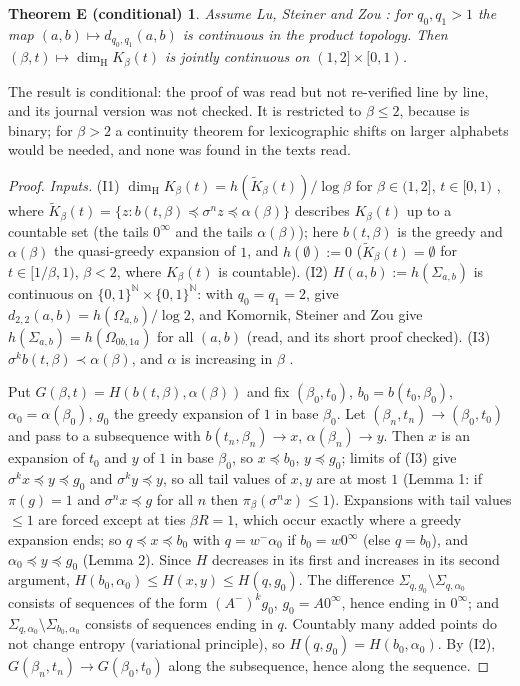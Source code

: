 \documentclass[11pt]{amsart}
\newtheorem*{thmE}{Theorem E (conditional)}
\theoremstyle{remark}
\newcommand{\N}{\mathbb{N}}
\newcommand{\dimH}{\dim_{\mathrm H}}
\newcommand{\lex}{\preccurlyeq}
\begin{document}
\begin{thmE}
Assume Lu, Steiner and Zou \cite[Theorem~1.4]{LSZ}: for $q_0,q_1>1$ the map $(a,b)\mapsto d_{q_0,q_1}(a,b)$ is continuous in the product topology. Then $(\beta,t)\mapsto\dimH K_\beta(t)$ is jointly continuous on $(1,2]\times[0,1)$.
\end{thmE}

The result is conditional: the proof of \cite[Theorem~1.4]{LSZ} was read but not re-verified line by line, and its journal version was not checked. It is restricted to $\beta\le2$, because \cite{LSZ} is binary; for $\beta>2$ a continuity theorem for lexicographic shifts on larger alphabets would be needed, and none was found in the texts read.

\begin{proof}
\emph{Inputs.} (I1) $\dimH K_\beta(t)=h(\tilde K_\beta(t))/\log\beta$ for $\beta\in(1,2]$, $t\in[0,1)$ \cite[Lemma~2.11]{AKcrit}, where $\tilde K_\beta(t)=\{z:b(t,\beta)\lex\sigma^nz\lex\alpha(\beta)\}$ describes $K_\beta(t)$ up to a countable set (the tails $0^\infty$ and the tails $\alpha(\beta)$); here $b(t,\beta)$ is the greedy and $\alpha(\beta)$ the quasi-greedy expansion of $1$, and $h(\emptyset):=0$ ($\tilde K_\beta(t)=\emptyset$ for $t\in[1/\beta,1)$, $\beta<2$, where $K_\beta(t)$ is countable). (I2) $H(a,b):=h(\Sigma_{a,b})$ is continuous on $\{0,1\}^\N\times\{0,1\}^\N$: with $q_0=q_1=2$, \cite[Theorem~1.2, Lemma~2.7]{LSZ} give $d_{2,2}(a,b)=h(\Omega_{a,b})/\log2$, and Komornik, Steiner and Zou \cite[Theorem~2.6]{KSZ} give $h(\Sigma_{a,b})=h(\Omega_{0b,1a})$ for all $(a,b)$ (read, and its short proof checked). (I3) $\sigma^kb(t,\beta)\prec\alpha(\beta)$, and $\alpha$ is increasing in $\beta$ \cite[Lemmas~2.1--2.2]{AKplat}.

Put $G(\beta,t)=H(b(t,\beta),\alpha(\beta))$ and fix $(\beta_0,t_0)$, $b_0=b(t_0,\beta_0)$, $\alpha_0=\alpha(\beta_0)$, $g_0$ the greedy expansion of $1$ in base $\beta_0$. Let $(\beta_n,t_n)\to(\beta_0,t_0)$ and pass to a subsequence with $b(t_n,\beta_n)\to x$, $\alpha(\beta_n)\to y$. Then $x$ is an expansion of $t_0$ and $y$ of $1$ in base $\beta_0$, so $x\lex b_0$, $y\lex g_0$; limits of (I3) give $\sigma^kx\lex y\lex g_0$ and $\sigma^ky\lex y$, so all tail values of $x,y$ are at most $1$ (Lemma 1: if $\pi(g)=1$ and $\sigma^nx\lex g$ for all $n$ then $\pi_\beta(\sigma^nx)\le1$). Expansions with tail values $\le1$ are forced except at ties $\beta R=1$, which occur exactly where a greedy expansion ends; so $q\lex x\lex b_0$ with $q=w^-\alpha_0$ if $b_0=w0^\infty$ (else $q=b_0$), and $\alpha_0\lex y\lex g_0$ (Lemma 2). Since $H$ decreases in its first and increases in its second argument, $H(b_0,\alpha_0)\le H(x,y)\le H(q,g_0)$. The difference $\Sigma_{q,g_0}\setminus\Sigma_{q,\alpha_0}$ consists of sequences of the form $(A^-)^kg_0$, $g_0=A0^\infty$, hence ending in $0^\infty$; and $\Sigma_{q,\alpha_0}\setminus\Sigma_{b_0,\alpha_0}$ consists of sequences ending in $q$. Countably many added points do not change entropy (variational principle), so $H(q,g_0)=H(b_0,\alpha_0)$. By (I2), $G(\beta_n,t_n)\to G(\beta_0,t_0)$ along the subsequence, hence along the sequence.
\end{proof}
\end{document}
